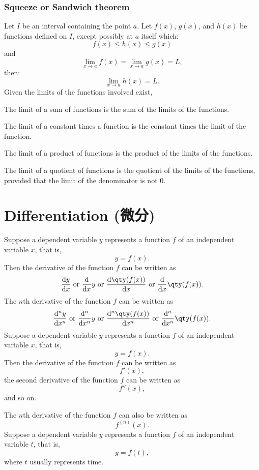 \documentclass[a4paper,12pt]{report}
\begin{document}
\subsubsection{Squeeze or Sandwich theorem}
Let \(I\) be an interval containing the point \(a\). Let $f(x)$, $g(x)$, and $h(x)$ be functions defined on \(I\), except possibly at \(a\) itself which:
\[f(x)\leq h(x)\leq g(x)\]
and
\[\lim_{x\to a}f(x)=\lim_{x\to a}g(x)=L,\]
then: 
\[\lim_{x\to a}h(x)=L.\]
Given the limits of the functions involved exist,
\bit
\item The limit of a sum of functions is the sum of the limits of the functions.
\item The limit of a constant times a function is the constant times the limit of the function.
\item The limit of a product of functions is the product of the limits of the functions.
\item The limit of a quotient of functions is the quotient of the limits of the functions, provided that the limit of the denominator is not 0.
\eit



\section{Differentiation (微分)}
Suppose a dependent variable $y$ represents a function $f$ of an independent variable $x$, that is,
\[y=f(x).\]
Then the derivative of the function $f$ can be written as
\[\frac{\mathrm{d}y}{\mathrm{d}x}\text{\ or\ }\frac{\mathrm{d}}{\mathrm{d}x}y\text{\ or\ }\frac{\mathrm{d}\qty(f(x))}{\mathrm{d}x}\text{\ or\ }\frac{\mathrm{d}}{\mathrm{d}x}\qty(f(x)).\]
The $n$th derivative of the function $f$ can be written as
\[\frac{\mathrm{d}^ny}{\mathrm{d}x^n}\text{\ or\ }\frac{\mathrm{d}^n}{\mathrm{d}x^n}y\text{\ or\ }\frac{\mathrm{d}^n\qty(f(x))}{\mathrm{d}x^n}\text{\ or\ }\frac{\mathrm{d}^n}{\mathrm{d}x^n}\qty(f(x)).\]
Suppose a dependent variable $y$ represents a function $f$ of an independent variable $x$, that is,
\[y=f(x).\]
Then the derivative of the function $f$ can be written as
\[f'(x),\]
the second derivative of the function $f$ can be written as
\[f''(x),\]
and so on.

The $n$th derivative of the function $f$ can also be written as
\[f^{(n)}(x).\]
Suppose a dependent variable $y$ represents a function $f$ of an independent variable $t$, that is,
\[y=f(t),\]
where $t$ usually represents time.
\end{document}
